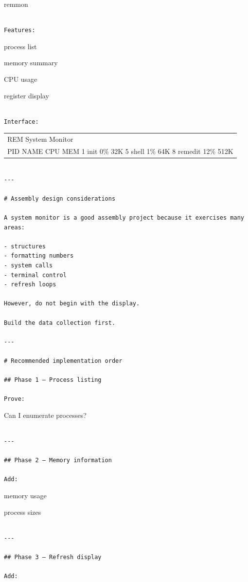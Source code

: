 \documentclass[
  oneside,
  openany]{book}
\begin{document}
remmon

\begin{verbatim}

Features:
\end{verbatim}

process list

memory summary

CPU usage

register display

\begin{verbatim}

Interface:
\end{verbatim}

\begin{longtable}[]{@{}
  >{\raggedright\arraybackslash}p{}@{}}
\toprule\noalign{}
\endhead
\bottomrule\noalign{}
\endlastfoot
REM System Monitor \\
PID NAME CPU MEM 1 init 0\% 32K 5 shell 1\% 64K 8 remedit 12\% 512K \\
\end{longtable}

\begin{verbatim}

---

# Assembly design considerations

A system monitor is a good assembly project because it exercises many areas:

- structures
- formatting numbers
- system calls
- terminal control
- refresh loops

However, do not begin with the display.

Build the data collection first.

---

# Recommended implementation order

## Phase 1 — Process listing

Prove:
\end{verbatim}

Can I enumerate processes?

\begin{verbatim}

---

## Phase 2 — Memory information

Add:
\end{verbatim}

memory usage

process sizes

\begin{verbatim}

---

## Phase 3 — Refresh display

Add:
\end{verbatim}
\end{document}
